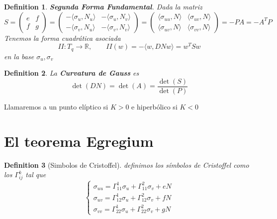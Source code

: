 \documentclass{myclass}
\newtheorem*{definition}{Definition}
\begin{document}
\begin{definition}
\textbf{Segunda Forma Fundamental}. Dada la matriz
\[
  S = \begin{pmatrix} e & f \\ f & g \end{pmatrix} = \begin{pmatrix} -\langle \sigma _u , N_u \rangle & -\langle \sigma _u , N_v \rangle \\ -\langle \sigma _v , N_u \rangle & -\langle \sigma _v , N_v \rangle   \end{pmatrix} =   \begin{pmatrix} \langle \sigma _{uu} , N \rangle & \langle \sigma _{uv} , N \rangle \\ \langle \sigma _{uv} , N \rangle & \langle \sigma _{vv} , N \rangle   \end{pmatrix} =  -PA = -A^TP 
\] 
Tenemos la forma cuadrática asociada
\[
II: T_q\to \mathbb{R}, \qquad II(w) = -\langle w , DNw \rangle = w^TSw
\] 
en la base $\sigma _u, \sigma _v$
\end{definition}

\begin{definition}
La \textbf{Curvatura de Gauss} es
\[
\det(DN) = \det(A) = \frac{\det(S)}{\det(P)}
\] 
\end{definition}
Llamaremos a un punto elíptico si $K>0$ e hiperbólico si $K<0$


\section{El teorema Egregium}
\begin{definition}[Simbolos de Cristoffel]
  definimos los símbolos de Cristoffel como los $\Gamma_{ij}^k$ tal que
  \[
  \begin{cases}
    \sigma _{uu} = \Gamma_{11}^1\sigma _u + \Gamma_{11}^2 \sigma _v + eN \\
    \sigma _{uv} = \Gamma_{12}^1\sigma _u + \Gamma_{12}^2 \sigma _v + fN \\
    \sigma _{vv} = \Gamma_{22}^1\sigma _u + \Gamma_{22}^2 \sigma _v + gN
  \end{cases}
  \] 
\end{definition}
\end{document}
